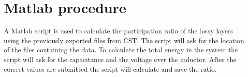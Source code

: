 \chapter{Matlab procedure}
A Matlab script is used to calculate the participation ratio of the lossy layers using the previously exported files from CST. The script will ask for the location of the files containing the data. To calculate the total energy in the system the script will ask for the capacitance and the voltage over the inductor. After the correct values are submitted the script will calculate and save the ratio. 
